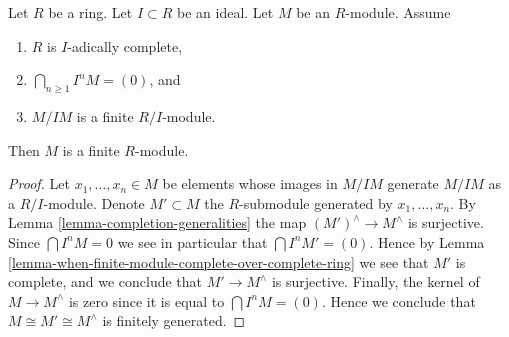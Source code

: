 \begin{lemma}
\label{lemma-finite-over-complete-ring}
Let $R$ be a ring. Let $I \subset R$ be an ideal. Let $M$ be an $R$-module.
Assume
\begin{enumerate}
\item $R$ is $I$-adically complete,
\item $\bigcap_{n \geq 1} I^nM = (0)$, and
\item $M/IM$ is a finite $R/I$-module.
\end{enumerate}
Then $M$ is a finite $R$-module.
\end{lemma}

\begin{proof}
Let $x_1, \ldots, x_n \in M$ be elements whose images in $M/IM$ generate
$M/IM$ as a $R/I$-module. Denote $M' \subset M$ the $R$-submodule
generated by $x_1, \ldots, x_n$. By Lemma \ref{lemma-completion-generalities}
the map $(M')^\wedge \to M^\wedge$ is surjective.
Since $\bigcap I^nM = 0$ we see in particular that $\bigcap I^nM' = (0)$.
Hence by Lemma \ref{lemma-when-finite-module-complete-over-complete-ring}
we see that $M'$ is complete, and we conclude that $M' \to M^\wedge$
is surjective. Finally, the kernel of $M \to M^\wedge$ is
zero since it is equal to $\bigcap I^nM = (0)$.
Hence we conclude that $M \cong M' \cong M^\wedge$
is finitely generated.
\end{proof}
